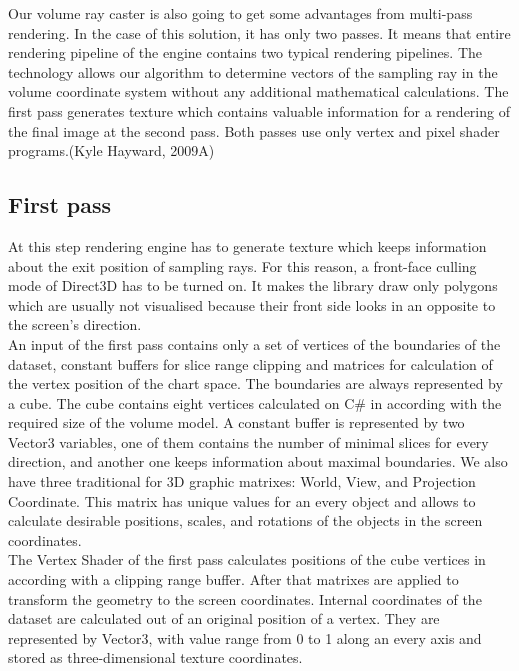 \documentclass[twoside, english, 11pt]{report}
\begin{document}
Our volume ray caster is also going to get some advantages from multi-pass rendering. In the case of this solution, it has only two passes. It means that entire rendering pipeline of the engine contains two typical rendering pipelines. The technology allows our algorithm to determine vectors of the sampling ray in the volume coordinate system without any additional mathematical calculations. The first pass generates texture which contains valuable information for a rendering of the final image at the second pass. Both passes use only vertex and pixel shader programs.(Kyle Hayward, 2009A)

\subsection{First pass}

At this step rendering engine has to generate texture which keeps information about the exit position of sampling rays. For this reason, a front-face culling mode of Direct3D has to be turned on. It makes the library draw only polygons which are usually not visualised because their front side looks in an opposite to the screen's direction.\\

An input of the first pass contains only a set of vertices of the boundaries of the dataset, constant buffers for slice range clipping and matrices for calculation of the vertex position of the chart space. The boundaries are always represented by a cube. The cube contains eight vertices calculated on C\# in according with the required size of the volume model. A constant buffer is represented by two Vector3 variables, one of them contains the number of minimal slices for every direction, and another one keeps information about maximal boundaries. We also have three traditional for 3D graphic matrixes: World, View, and Projection Coordinate. This matrix has unique values for an every object and allows to calculate desirable positions, scales, and rotations of the objects in the screen coordinates.\\

The Vertex Shader of the first pass calculates positions of the cube vertices in according with a clipping range buffer. After that matrixes are applied to transform the geometry to the screen coordinates. Internal coordinates of the dataset are calculated out of an original position of a vertex. They are represented by Vector3, with value range from 0 to 1 along an every axis and stored as three-dimensional texture coordinates.\\
\end{document}
